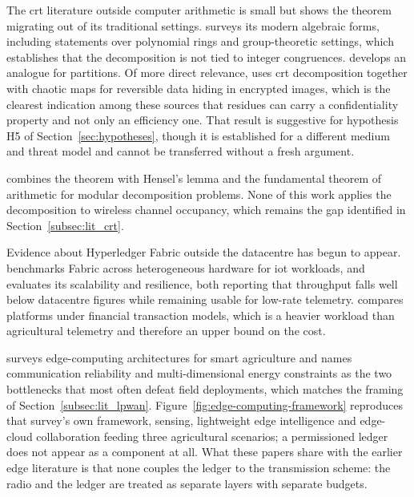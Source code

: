 \documentclass[12pt,a4paper,oneside]{book}
\begin{document}
\label{subsec:lit_crt_extended}

The \gls{crt} literature outside computer arithmetic is small but shows the
theorem migrating out of its traditional settings.
\textcite{luo2023researchapplication} surveys its modern algebraic forms,
including statements over polynomial rings and group-theoretic settings, which
establishes that the decomposition is not tied to integer congruences.
\textcite{seethalakshmi2023chineseremainder} develops an analogue for
partitions. Of more direct relevance,
\textcite{yavuz2025reversibledata} uses \gls{crt} decomposition together with
chaotic maps for reversible data hiding in encrypted images, which is the
clearest indication among these sources that residues can carry a
confidentiality property and not only an efficiency one. That result is
suggestive for
hypothesis H5 of Section~\ref{sec:hypotheses}, though it is established for a
different medium and threat model and cannot be transferred without a fresh
argument.

\textcite{oktaviansyah2025hybridizinghensel} combines the theorem with Hensel's
lemma and the fundamental theorem of arithmetic for modular decomposition
problems. None of this work applies the decomposition to wireless channel
occupancy, which remains the gap identified in Section~\ref{subsec:lit_crt}.

\label{subsec:lit_edge_extended}

Evidence about Hyperledger Fabric outside the datacentre has begun to appear.
\textcite{zulkarnain2025performancebenchmarking} benchmarks Fabric across
heterogeneous hardware for \gls{iot} workloads, and
\textcite{pebriyanti2025evaluationscalability} evaluates its scalability and
resilience, both reporting that throughput falls well below datacentre figures
while remaining usable for low-rate telemetry.
\textcite{kwadzode2025performancecomparison} compares platforms under financial
transaction models, which is a heavier workload than agricultural telemetry and
therefore an upper bound on the cost.

\textcite{gong2025edge} surveys edge-computing architectures for smart
agriculture and names communication reliability and multi-dimensional energy
constraints as the two bottlenecks that most often defeat field deployments,
which matches the framing of Section~\ref{subsec:lit_lpwan}. Figure~\ref{fig:edge-computing-framework}
reproduces that survey's own framework, sensing, lightweight edge
intelligence and edge-cloud collaboration feeding three agricultural
scenarios; a permissioned ledger does not appear as a component at all. What
these papers share with the earlier edge literature is that none couples the
ledger to the transmission scheme: the radio and the ledger are treated as
separate layers with separate budgets.
\end{document}
